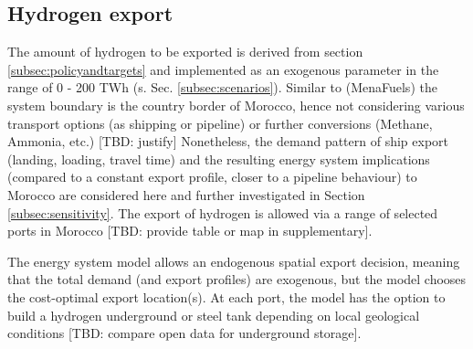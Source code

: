 \subsection{Hydrogen export}
\label{subsec:hydrogen_export}
The amount of hydrogen to be exported is derived from section \ref{subsec:policyandtargets} and implemented as an exogenous parameter in the range of 0 - 200 TWh (s. Sec. \ref{subsec:scenarios}). Similar to (MenaFuels) \cite{Ersoy2022} the system boundary is the country border of Morocco, hence not considering various transport options (as shipping or pipeline) or further conversions (Methane, Ammonia, etc.) [TBD: justify]
Nonetheless, the demand pattern of ship export (landing, loading, travel time) and the resulting energy system implications (compared to a constant export profile, closer to a pipeline behaviour) to Morocco are considered here and further investigated in Section \ref{subsec:sensitivity}.
The export of hydrogen is allowed via a range of selected ports in Morocco [TBD: provide table or map in supplementary]. 

The energy system model allows an endogenous spatial export decision, meaning that the total demand (and export profiles) are exogenous, but the model chooses the  cost-optimal export location(s). At each port, the model has the option to build a hydrogen underground or steel tank depending on local geological conditions [TBD: compare open data for underground storage].






